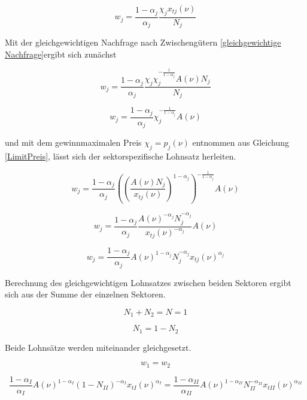 \begin{equation}
w_j=\frac{1-\alpha_j}{\alpha_j}\frac{\chi_jx_{tj}(\nu)}{N_j}
\end{equation}


Mit der gleichgewichtigen Nachfrage nach Zwischengütern \eqref{gleichgewichtige Nachfrage}ergibt sich zunächst


\begin{equation}
w_j=\frac{1-\alpha_j}{\alpha_j}\frac{\chi_j\chi_j^{-\frac{1}{1-\alpha_j}}A(\nu)N_j}{N_j}
\end{equation}


\begin{equation}
w_j=\frac{1-\alpha_j}{\alpha_j} \chi_j^{-\frac{1}{1-\alpha_j}}A(\nu)
\end{equation}


und mit dem gewinnmaximalen Preis $\chi_j=p_j(\nu)$ entnommen aus Gleichung \eqref{LimitPreis}, lässt sich der sektorspezifische Lohnsatz herleiten. 


\begin{equation*}
w_j=\frac{1-\alpha_j}{\alpha_j} \left(\left(\frac{A(\nu)N_j}{x_{tj}(\nu)}\right)^{1-\alpha_j}\right)^{-\frac{1}{1-\alpha_j}}A(\nu)
\end{equation*}


\begin{equation*}
w_j=\frac{1-\alpha_j}{\alpha_j}\frac{A(\nu)^{-\alpha_j}N_j^{-\alpha_j}}{x_{tj}(\nu)^{-\alpha_j}}A(\nu)
\end{equation*}


\begin{equation}
\boxed{w_j=\frac{1-\alpha_j}{\alpha_j}A(\nu)^{1-\alpha_j}N_j^{-\alpha_j}x_{tj}(\nu)^{\alpha_j}}
\end{equation}


Berechnung des gleichgewichtigen Lohnsatzes zwischen beiden Sektoren ergibt sich aus der Summe der einzelnen Sektoren. 


\begin{equation}
N_1+N_{2}=N=1
\end{equation}


\begin{equation}
N_1=1-N_{2}
\end{equation}


Beide Lohnsätze werden miteinander gleichgesetzt.


\begin{equation}
w_1=w_{2}
\end{equation}


\begin{equation*}
\frac{1-\alpha_I}{\alpha_I}A(\nu)^{1-\alpha_I}(1-N_{II})^{-\alpha_I}x_{tI}(\nu)^{\alpha_I}=\frac{1-\alpha_{II}}{\alpha_{II}}A(\nu)^{1-\alpha_{II}}N_{II}^{-\alpha_{II}}x_{tII}(\nu)^{\alpha_{II}}
\end{equation*}


